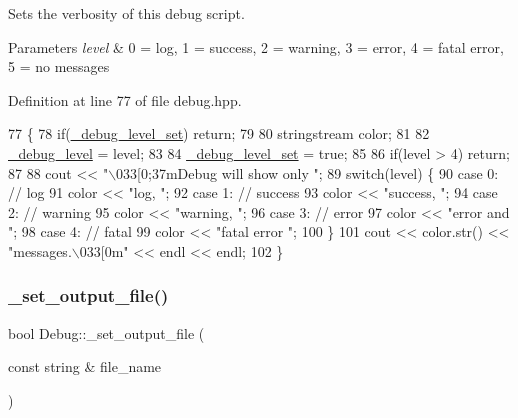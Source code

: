 Sets the verbosity of this debug script. 
\begin{DoxyParams}{Parameters}
{\em level} & 0 = log, 1 = success, 2 = warning, 3 = error, 4 = fatal error, 5 = no messages \\
\hline
\end{DoxyParams}


Definition at line 77 of file debug.\+hpp.


\begin{DoxyCode}
77                                            \{
78         \textcolor{keywordflow}{if}(\hyperlink{namespace_debug_a4e4e625e0385ebd41e90fe50042aad6c}{\_debug\_level\_set}) \textcolor{keywordflow}{return};
79 
80         stringstream color;
81 
82         \hyperlink{namespace_debug_ae3b1c0ac5502d48f0ae41e1bf5c7a68e}{\_debug\_level} = level;
83 
84         \hyperlink{namespace_debug_a4e4e625e0385ebd41e90fe50042aad6c}{\_debug\_level\_set} = \textcolor{keyword}{true};
85 
86         \textcolor{keywordflow}{if}(level > 4) \textcolor{keywordflow}{return};
87 
88         cout << \textcolor{stringliteral}{"\(\backslash\)033[0;37mDebug will show only "};
89         \textcolor{keywordflow}{switch}(level) \{
90             \textcolor{keywordflow}{case} 0: \textcolor{comment}{// log}
91                 color << \textcolor{stringliteral}{"log, "};
92             \textcolor{keywordflow}{case} 1: \textcolor{comment}{// success}
93                 color << \textcolor{stringliteral}{"success, "};
94             \textcolor{keywordflow}{case} 2: \textcolor{comment}{// warning}
95                 color << \textcolor{stringliteral}{"warning, "};
96             \textcolor{keywordflow}{case} 3: \textcolor{comment}{// error}
97                 color << \textcolor{stringliteral}{"error and "};
98             \textcolor{keywordflow}{case} 4: \textcolor{comment}{// fatal}
99                 color << \textcolor{stringliteral}{"fatal error "};
100         \}
101         cout << color.str() << \textcolor{stringliteral}{"messages.\(\backslash\)033[0m"} << endl << endl;
102     \}
\end{DoxyCode}
\mbox{\label{namespace_debug_af089c69b3754cca55f1dc6afe22c2ded}} 
\subsubsection{\texorpdfstring{\+\_\+set\+\_\+output\+\_\+file()}{\_set\_output\_file()}}
{\footnotesize\ttfamily bool Debug\+::\+\_\+set\+\_\+output\+\_\+file (\begin{DoxyParamCaption}\item[{const string \&}]{file\+\_\+name }\end{DoxyParamCaption})\hspace{0.3cm}{\ttfamily [inline]}}

